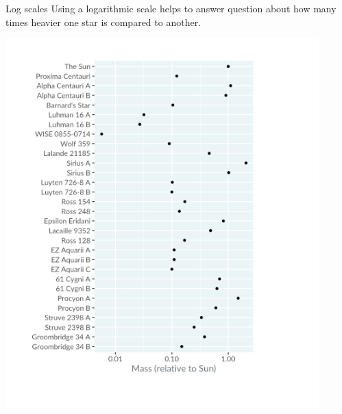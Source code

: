 \documentclass[
  ignorenonframetext,
]{beamer}
\begin{document}
\begin{frame}{Log scales}
\label{log-scales}
Using a logarithmic scale helps to answer question about how many times
heavier one star is compared to another.

\includegraphics{../images/im61.png}
\end{frame}
\end{document}
